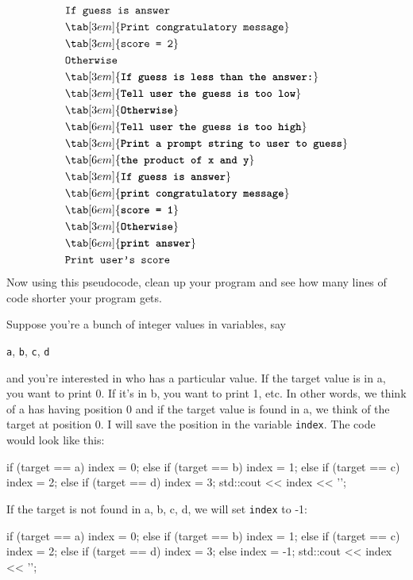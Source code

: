 \begin{align*}
& \texttt{If guess is answer}\\
& \tab[3em]{\texttt{Print congratulatory message}}\\
& \tab[3em]{\texttt{score = 2}}\\
& \texttt{Otherwise}\\
& \tab[3em]{\texttt{\textbf{If guess is less than the answer:}}}\\
& \tab[3em]{\texttt{\textbf{Tell user the guess is too low}}}\\
& \tab[3em]{\texttt{\textbf{Otherwise}}}\\
& \tab[6em]{\texttt{\textbf{Tell user the guess is too high}}}\\
& \tab[3em]{\texttt{\textbf{Print a prompt string to user to guess}}}\\
& \tab[6em]{\texttt{\textbf{the product of x and y}}}\\
& \tab[3em]{\texttt{\textbf{If guess is answer}}}\\
& \tab[6em]{\texttt{\textbf{print congratulatory message}}}\\
& \tab[6em]{\texttt{\textbf{score = 1}}}\\
& \tab[3em]{\texttt{\textbf{Otherwise}}}\\
& \tab[6em]{\texttt{\textbf{print answer}}}\\
& \texttt{Print user's score}\\
\end{align*}
Now using this pseudocode, clean up your program and see how many lines
of code shorter your program gets.

\newpage{}

Suppose you're a bunch of integer values in variables,
say
\begin{center}
\texttt{a}, \texttt{b}, \texttt{c}, \texttt{d}
\end{center}
and you're interested in who has a particular value. If
the target value is in a, you want to print 0. If it's
in b, you want to print 1, etc. In other words, we think of a has having
position 0 and if the target value is found in a, we think of the target
at position 0. I will save the position in the variable \texttt{index}.
The code would look like this:\\
\begin{console}
if (target == a)
{
    index = 0;
}
else if (target == b)
{
    index = 1;
}
else if (target == c)
{
    index = 2;
}
else if (target == d)
{
    index = 3;
}
std::cout << index << '\n';
\end{console}
If the target is not found in a, b, c, d, we will set \texttt{index} to -1:\\
\begin{console}
if (target == a)
{
    index = 0;
}
else if (target == b)
{
    index = 1;
}
else if (target == c)
{
    index = 2;
}
else if (target == d)
{
    index = 3;
}
else
{
    index = -1;
}
std::cout << index << '\n';
\end{console}

